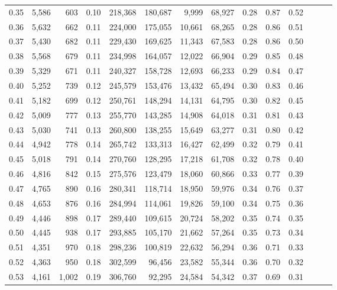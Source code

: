 \begin{tabular}{rrrrrrrrrrrrrr}
0.35 &  5,586 &    603 &  0.10 &  218,368 &  180,687 &   9,999 &  68,927 &  0.28 &  0.87 &      0.52 \\
0.36 &  5,632 &    662 &  0.11 &  224,000 &  175,055 &  10,661 &  68,265 &  0.28 &  0.86 &      0.51 \\
0.37 &  5,430 &    682 &  0.11 &  229,430 &  169,625 &  11,343 &  67,583 &  0.28 &  0.86 &      0.50 \\
0.38 &  5,568 &    679 &  0.11 &  234,998 &  164,057 &  12,022 &  66,904 &  0.29 &  0.85 &      0.48 \\
0.39 &  5,329 &    671 &  0.11 &  240,327 &  158,728 &  12,693 &  66,233 &  0.29 &  0.84 &      0.47 \\
0.40 &  5,252 &    739 &  0.12 &  245,579 &  153,476 &  13,432 &  65,494 &  0.30 &  0.83 &      0.46 \\
0.41 &  5,182 &    699 &  0.12 &  250,761 &  148,294 &  14,131 &  64,795 &  0.30 &  0.82 &      0.45 \\
0.42 &  5,009 &    777 &  0.13 &  255,770 &  143,285 &  14,908 &  64,018 &  0.31 &  0.81 &      0.43 \\
0.43 &  5,030 &    741 &  0.13 &  260,800 &  138,255 &  15,649 &  63,277 &  0.31 &  0.80 &      0.42 \\
0.44 &  4,942 &    778 &  0.14 &  265,742 &  133,313 &  16,427 &  62,499 &  0.32 &  0.79 &      0.41 \\
0.45 &  5,018 &    791 &  0.14 &  270,760 &  128,295 &  17,218 &  61,708 &  0.32 &  0.78 &      0.40 \\
0.46 &  4,816 &    842 &  0.15 &  275,576 &  123,479 &  18,060 &  60,866 &  0.33 &  0.77 &      0.39 \\
0.47 &  4,765 &    890 &  0.16 &  280,341 &  118,714 &  18,950 &  59,976 &  0.34 &  0.76 &      0.37 \\
0.48 &  4,653 &    876 &  0.16 &  284,994 &  114,061 &  19,826 &  59,100 &  0.34 &  0.75 &      0.36 \\
0.49 &  4,446 &    898 &  0.17 &  289,440 &  109,615 &  20,724 &  58,202 &  0.35 &  0.74 &      0.35 \\
0.50 &  4,445 &    938 &  0.17 &  293,885 &  105,170 &  21,662 &  57,264 &  0.35 &  0.73 &      0.34 \\
0.51 &  4,351 &    970 &  0.18 &  298,236 &  100,819 &  22,632 &  56,294 &  0.36 &  0.71 &      0.33 \\
0.52 &  4,363 &    950 &  0.18 &  302,599 &   96,456 &  23,582 &  55,344 &  0.36 &  0.70 &      0.32 \\
0.53 &  4,161 &  1,002 &  0.19 &  306,760 &   92,295 &  24,584 &  54,342 &  0.37 &  0.69 &      0.31 \\

\end{tabular}
